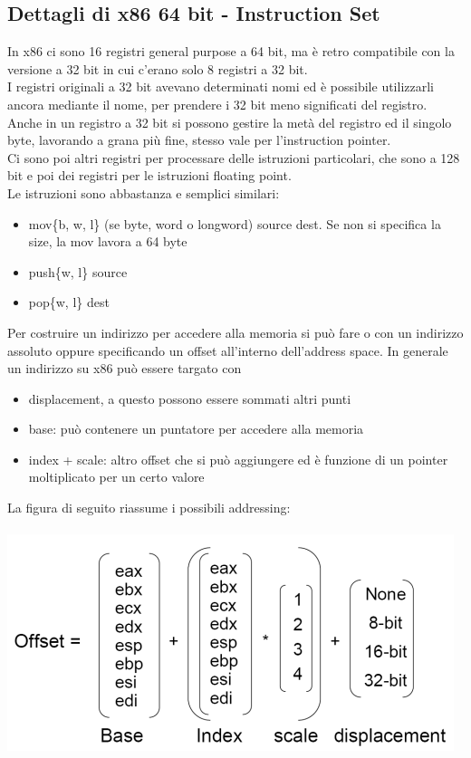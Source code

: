 \documentclass[14pt, oneside]{book}
\begin{document}
\subsection{Dettagli di x86 64 bit - Instruction Set}
In x86 ci sono 16 registri general purpose a 64 bit, ma è retro compatibile con la versione a 32 bit in cui c'erano solo 8 registri a 32 bit.\\ I registri originali a 32 bit avevano determinati nomi ed è possibile utilizzarli ancora mediante il nome, per prendere i 32 bit meno significati del registro. Anche in un registro a 32 bit si possono gestire la metà del registro ed il singolo byte, lavorando a grana più fine, stesso vale per l'instruction pointer.\\ Ci sono poi altri registri per processare delle istruzioni particolari, che sono a 128 bit e poi dei registri per le istruzioni floating point.\\ Le istruzioni sono abbastanza e semplici similari:
\begin{itemize}
\item \textsf{mov\{b, w, l\}} (se byte, word o longword) \textsf{source dest}. Se non si specifica la size, la mov lavora a 64 byte
\item \textsf{push\{w, l\} source}
\item \textsf{pop\{w, l\} dest}
\end{itemize}
Per costruire un indirizzo per accedere alla memoria si può fare o con un indirizzo assoluto oppure specificando un offset all'interno dell'address space. In generale un indirizzo su x86 può essere targato con
\begin{itemize}
\item displacement, a questo possono essere sommati altri punti
\item base: può contenere un puntatore per accedere alla memoria
\item index + scale: altro offset che si può aggiungere ed è funzione di un pointer moltiplicato per un certo valore 
\end{itemize}
La figura di seguito riassume i possibili addressing:\\\\
\includegraphics[scale=0.6]{immagini/address_offset}\\\\
\end{document}
